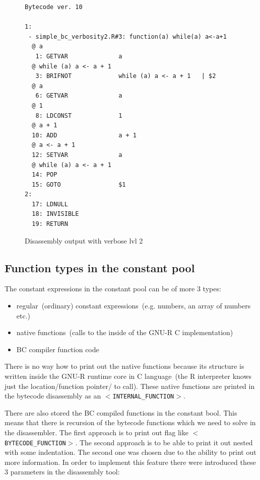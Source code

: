 \documentclass[thesis=M,english]{FITthesis}[2018/10/20]
\newcommand{\code}[1]{\texttt{#1}}
\begin{document}
\begin{figure}[H]
\begin{lstlisting}
Bytecode ver. 10

1:
 - simple_bc_verbosity2.R#3: function(a) while(a) a<-a+1
  @ a
   1: GETVAR              a
  @ while (a) a <- a + 1
   3: BRIFNOT             while (a) a <- a + 1	 | $2
  @ a
   6: GETVAR              a
  @ 1
   8: LDCONST             1
  @ a + 1
  10: ADD                 a + 1
  @ a <- a + 1
  12: SETVAR              a
  @ while (a) a <- a + 1
  14: POP
  15: GOTO                $1
2:
  17: LDNULL
  18: INVISIBLE
  19: RETURN
\end{lstlisting}
	\caption{Disassembly output with verbose lvl 2}\label{fig:disassembly-verbose-2}
\end{figure}


\subsection{Function types in the constant pool}

The constant expressions in the constant pool can be of more 3 types:

\begin{itemize}
	\item regular~(ordinary) constant expressions~(e.g. numbers, an array of numbers etc.)
	\item native functions~(calls to the inside of the GNU-R C implementation)
	\item BC compiler function code
\end{itemize}

There is no way how to print out the native functions because its structure is written inside the GNU-R runtime core in C language~(the R interpreter knows just the location/function pointer/ to call). These native functions are printed in the bytecode disassembly as an \code{$<$INTERNAL{\_}FUNCTION$>$}.

There are also stored the BC compiled functions in the constant bool. This means that there is recursion of the bytecode functions which we need to solve in the disassembler. The first approach is to print out flag like \code{$<$BYTECODE{\_}FUNCTION$>$}. The second approach is to be able to print it out nested with some indentation. The second one was chosen due to the ability to print out more information. In order to implement this feature there were introduced these 3 parameters in the disassembly tool:
\end{document}
